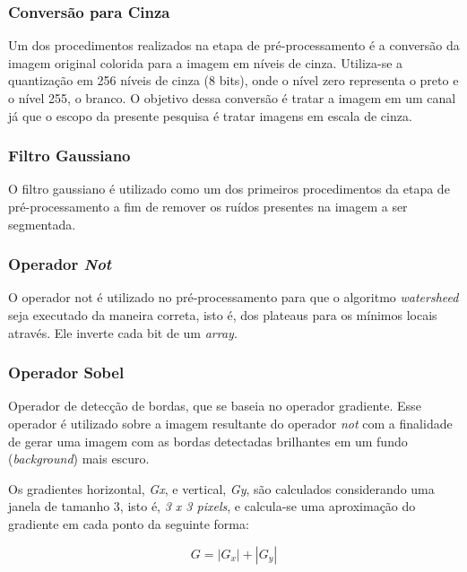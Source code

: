 \subsubsection{Conversão para Cinza}
Um dos procedimentos realizados na etapa de pré-processamento é a conversão da imagem original colorida para a imagem em níveis de cinza. Utiliza-se a quantização em 256 níveis de cinza (8 bits), onde o nível zero representa o preto e o nível 255, o branco.
O objetivo dessa conversão é tratar a imagem em um canal já que o escopo da presente pesquisa é tratar imagens em escala de cinza.

\subsubsection{Filtro Gaussiano}
O filtro gaussiano é utilizado como um dos primeiros procedimentos da etapa de pré-processamento a fim de remover os ruídos presentes na imagem a ser segmentada.


\subsubsection{Operador \textit{Not}}
O operador not é utilizado no pré-processamento para que o algoritmo \textit{watersheed } seja executado da maneira correta, isto é, dos plateaus para os mínimos locais através. Ele inverte cada bit de um \textit{array}.

\subsubsection{Operador Sobel}
Operador de detecção de bordas, que se baseia no operador gradiente. Esse operador é utilizado sobre a imagem resultante do operador \textit{not} com a finalidade de gerar uma imagem com as bordas detectadas brilhantes em um fundo (\textit{background}) mais escuro.

Os gradientes horizontal, \textit{Gx}, e vertical, \textit{Gy}, são calculados considerando uma janela de tamanho 3, isto é, \textit{3 x 3 pixels}, e calcula-se uma aproximação do gradiente em cada ponto da seguinte forma: \citep{sobel}

\[G = |G_{x}| + |G_{y}|\]



